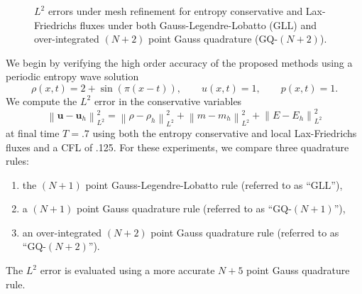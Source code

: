 \documentclass[preprint,10pt]{elsarticle}
\theoremstyle{definition}
\theoremstyle{lemma}
\theoremstyle{theorem}
\theoremstyle{assumption}
\newcommand{\nor}[1]{\left\| #1 \right\|}
\newcommand{\LRp}[1]{\left( #1 \right)}
\begin{document}
\begin{figure}
{
}
\caption{$L^2$ errors under mesh refinement for entropy conservative and Lax-Friedrichs fluxes under both Gauss-Legendre-Lobatto (GLL) and over-integrated $(N+2)$ point Gauss quadrature (GQ-$(N+2)$).}
\label{fig:convergence}
\end{figure}
We begin by verifying the high order accuracy of the proposed methods using a periodic entropy wave solution
\[
\rho(x,t) = 2 + \sin\LRp{\pi (x - t)}, \qquad u(x,t) = 1, \qquad p(x,t) = 1.
\]
We compute the $L^2$ error in the conservative variables 
\[
\nor{\bm{u} - \bm{u}_h}_{L^2}^2 = \nor{\rho - \rho_h}_{L^2}^2 + \nor{m - m_h}_{L^2}^2 + \nor{E - E_h}_{L^2}^2
\]
at final time $T = .7$ using both the entropy conservative and local Lax-Friedrichs fluxes and a CFL of .125.  For these experiments, we compare three quadrature rules: 
\begin{enumerate}
\item the $(N+1)$ point Gauss-Legendre-Lobatto rule (referred to as ``GLL''),
\item a $(N+1)$ point Gauss quadrature rule (referred to as ``GQ-$(N+1)$''),
\item an over-integrated $(N+2)$ point Gauss quadrature rule (referred to as ``GQ-$(N+2)$'').  
\end{enumerate}
The $L^2$ error is evaluated using a more accurate $N+5$ point Gauss quadrature rule.  
\end{document}

